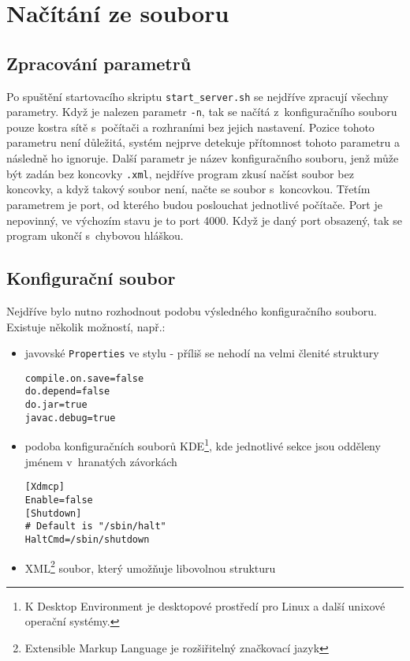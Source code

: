 \section{Načítání ze souboru} \label{xml_soubor}
\subsection{Zpracování parametrů}
Po spuštění startovacího skriptu \verb|start_server.sh| se nejdříve zpracují všechny parametry. Když je nalezen parametr \verb|-n|, tak se načítá z~konfiguračního souboru pouze kostra sítě s~počítači a rozhraními bez jejich nastavení. Pozice tohoto parametru není důležitá, systém nejprve detekuje přítomnost tohoto parametru a následně ho ignoruje. Další parametr je název konfiguračního souboru, jenž může být zadán bez koncovky \verb|.xml|, nejdříve program zkusí načíst soubor bez koncovky, a když takový soubor není, načte se soubor s~koncovkou. Třetím parametrem je port, od kterého budou poslouchat jednotlivé počítače. Port je nepovinný, ve výchozím stavu je to port 4000. Když je daný port obsazený, tak se program ukončí s~chybovou hláškou.


\subsection{Konfigurační soubor}
Nejdříve bylo nutno rozhodnout podobu výsledného konfiguračního souboru. Existuje několik možností, např.:
\begin{itemize}
 \item javovské \verb|Properties| ve stylu  - příliš se nehodí na velmi členité struktury
\begin{verbatim}
compile.on.save=false
do.depend=false
do.jar=true
javac.debug=true
\end{verbatim} 

 \item podoba konfiguračních souborů KDE\footnote{K Desktop Environment je desktopové prostředí pro Linux a další unixové operační systémy.}, kde jednotlivé sekce jsou odděleny jménem v~hranatých závorkách
\begin{verbatim}
[Xdmcp]
Enable=false
[Shutdown]
# Default is "/sbin/halt"
HaltCmd=/sbin/shutdown
\end{verbatim} 

 \item XML\footnote{Extensible Markup Language je rozšiřitelný značkovací jazyk} soubor, který umožňuje libovolnou strukturu
\end{itemize}

